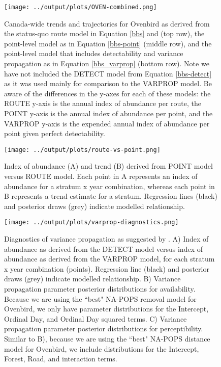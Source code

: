 \documentclass[12pt]{article}
\begin{document}
\begin{figure}[h]
	\texttt{[image: ../output/plots/OVEN-combined.png]}
	\caption{Canada-wide trends and trajectories for Ovenbird as derived from the status-quo route model in Equation \ref{bbs} and \citet{smith_spatially_2023} (top row), the point-level model as in Equation \ref{bbs-point} (middle row), and the point-level model that includes detectability and variance propagation as in Equation \ref{bbs_varprop} (bottom row). Note we have not included the DETECT model from Equation \ref{bbs-detect} as it was used mainly for comparison to the VARPROP model. Be aware of the differences in the y-axes for each of these models: the ROUTE y-axis is the annual index of abundance per route, the POINT y-axis is the annual index of abundance per point, and the VARPROP y-axis is the expended annual index of abundance per point given perfect detectability.}
	\label{fig:oven-combined}
\end{figure}

\begin{figure}[h]
	\texttt{[image: ../output/plots/route-vs-point.png]}
	\caption{Index of abundance (A) and trend (B) derived from POINT model versus ROUTE model. Each point in A represents an index of abundance for a stratum x year combination, whereas each point in B represents a trend estimate for a stratum. Regression lines (black) and posterior draws (grey) indicate modelled relationship.}
	\label{fig:route-vs-point}
\end{figure}

\begin{figure}[h]
	\texttt{[image: ../output/plots/varprop-diagnostics.png]}
	\caption{Diagnostics of variance propagation as suggested by \citet{bravington_variance_2021}. A) Index of abundance as derived from the DETECT model versus index of abundance as derived from the VARPROP model, for each stratum x year combination (points). Regression line (black) and posterior draws (grey) indicate modelled relationship. B) Variance propagation parameter posterior distributions for availability. Because we are using the ``best" NA-POPS removal model for Ovenbird, we only have parameter distributions for the Intercept, Ordinal Day, and Ordinal Day squared terms. C) Variance propagation parameter posterior distributions for perceptibility. Similar to B), because we are using the ``best" NA-POPS distance model for Ovenbird, we include distributions for the Intercept, Forest, Road, and interaction terms.}
	\label{fig:varprop-diagnostics}
\end{figure}
\end{document}
